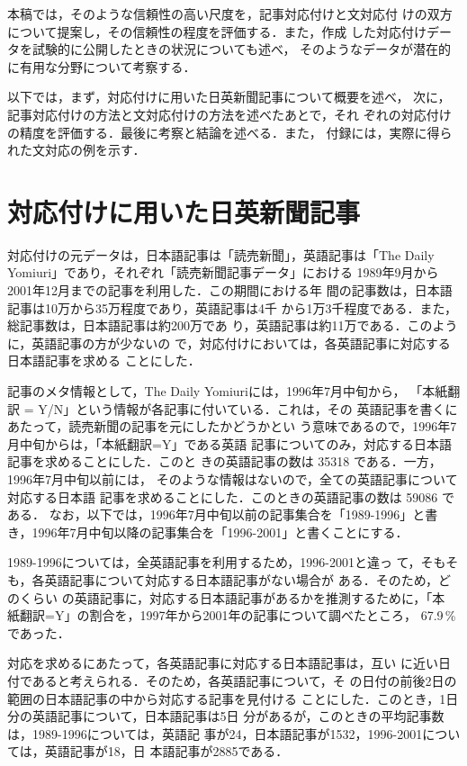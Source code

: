 本稿では，そのような信頼性の高い尺度を，記事対応付けと文対応付
けの双方について提案し，その信頼性の程度を評価する．また，作成
した対応付けデータを試験的に公開したときの状況についても述べ，
そのようなデータが潜在的に有用な分野について考察する．

以下では，まず，対応付けに用いた日英新聞記事について概要を述べ，
次に，記事対応付けの方法と文対応付けの方法を述べたあとで，それ
ぞれの対応付けの精度を評価する．最後に考察と結論を述べる．また，
付録には，実際に得られた文対応の例を示す．


\section{対応付けに用いた日英新聞記事}
\label{sec:corpora}

対応付けの元データは，日本語記事は「読売新聞」，英語記事は「The
Daily Yomiuri」であり，それぞれ「読売新聞記事データ」における
1989年9月から2001年12月までの記事を利用した．この期間における年
間の記事数は，日本語記事は10万から35万程度であり，英語記事は4千
から1万3千程度である．また，総記事数は，日本語記事は約200万であ
り，英語記事は約11万である．このように，英語記事の方が少ないの
で，対応付けにおいては，各英語記事に対応する日本語記事を求める
ことにした．

記事のメタ情報として，The Daily Yomiuriには，1996年7月中旬から，
「本紙翻訳 = Y/N」という情報が各記事に付いている．これは，その
英語記事を書くにあたって，読売新聞の記事を元にしたかどうかとい
う意味であるので，1996年7月中旬からは，「本紙翻訳=Y」である英語
記事についてのみ，対応する日本語記事を求めることにした．このと
きの英語記事の数は 35318 である．一方，1996年7月中旬以前には，
そのような情報はないので，全ての英語記事について対応する日本語
記事を求めることにした．このときの英語記事の数は  59086  である．
なお，以下では，1996年7月中旬以前の記事集合を「1989-1996」と書
き，1996年7月中旬以降の記事集合を「1996-2001」と書くことにする．

1989-1996については，全英語記事を利用するため，1996-2001と違っ
て，そもそも，各英語記事について対応する日本語記事がない場合が
ある．そのため，どのくらい
の英語記事に，対応する日本語記事があるかを推測するために，「本
紙翻訳=Y」の割合を，1997年から2001年の記事について調べたところ，
67.9\,\%であった．

対応を求めるにあたって，各英語記事に対応する日本語記事は，互い
に近い日付であると考えられる．そのため，各英語記事について，そ
の日付の前後2日の範囲の日本語記事の中から対応する記事を見付ける
ことにした．このとき，1日分の英語記事について，日本語記事は5日
分があるが，このときの平均記事数は，1989-1996については，英語記
事が24，日本語記事が1532，1996-2001については，英語記事が18，日
本語記事が2885である．

